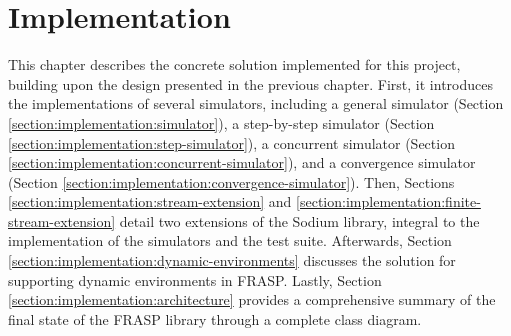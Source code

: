 
\chapter{Implementation}
\label{chapter:implementation}

This chapter describes the concrete solution implemented for this project,
building upon the design presented in the previous chapter. First, it
introduces the implementations of several simulators, including a general
simulator (Section \ref{section:implementation:simulator}), a step-by-step
simulator (Section \ref{section:implementation:step-simulator}), a concurrent
simulator (Section \ref{section:implementation:concurrent-simulator}), and a
convergence simulator (Section
\ref{section:implementation:convergence-simulator}). Then, Sections
\ref{section:implementation:stream-extension} and
\ref{section:implementation:finite-stream-extension} detail two extensions of
the Sodium library, integral to the implementation of the simulators and the
test suite. Afterwards, Section
\ref{section:implementation:dynamic-environments} discusses the solution for
supporting dynamic environments in FRASP. Lastly, Section
\ref{section:implementation:architecture} provides a comprehensive summary of
the final state of the FRASP library through a complete class diagram.








